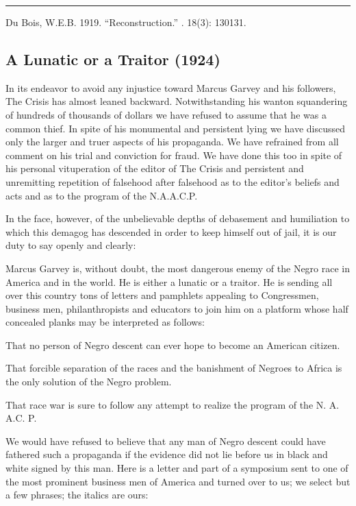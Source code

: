 \documentclass[letterpaper,10pt,english]{jupyterBook}
\begin{document}
\bigskip\hrule\bigskip


\sphinxAtStartPar
{} Du Bois, W.E.B. 1919. “Reconstruction.” . 18(3): 130\sphinxhyphen{}131.


\subsection{A Lunatic or a Traitor (1924)}
\label{\detokenize{Volumes/28/01/lunatic_or_a_traitor:a-lunatic-or-a-traitor-1924}}\label{\detokenize{Volumes/28/01/lunatic_or_a_traitor::doc}}
\sphinxAtStartPar
In its endeavor to avoid any injustice toward Marcus Garvey and his followers, The Crisis  has almost leaned backward. Notwithstanding his wanton squandering of hundreds of thousands of dollars we have refused to assume that he was a common thief. In spite of his monumental and persistent lying we have discussed only the larger and truer aspects of his propaganda. We have refrained from all comment on his trial and conviction for fraud. We have done this too in spite of his personal vituperation of the editor of The Crisis  and persistent and unremitting repetition of falsehood after falsehood as to the editor’s beliefs and acts and as to the program of the N.A.A.C.P.

\sphinxAtStartPar
In the face, however, of the unbelievable depths of debasement and humiliation to which this demagog has descended in order to keep himself out of jail, it is our duty to say openly and clearly:

\sphinxAtStartPar
Marcus Garvey is, without doubt, the most dangerous enemy of the Negro race in America and in the world. He is either a lunatic or a traitor. He is sending all over this country tons of letters and pamphlets appealing to Congressmen, business men, philanthropists and educators to join him on a platform whose half concealed planks may be interpreted as follows:

\sphinxAtStartPar
That no person of Negro descent can ever hope to become an American citizen.

\sphinxAtStartPar
That forcible separation of the races and the banishment of Negroes to Africa is the only solution of the Negro problem.

\sphinxAtStartPar
That race war is sure to follow any attempt to realize the program of the N. A. A.C. P.

\sphinxAtStartPar
We would have refused to believe that any man of Negro descent could have fathered such a propaganda if the evidence did not lie before us in black and white signed by this man. Here is a letter and part of a symposium sent to one of the most prominent business men of America and turned over to us; we select but a few phrases; the italics are ours:
\end{document}
